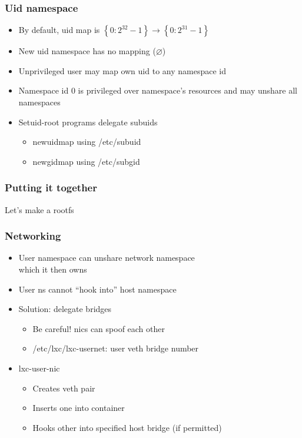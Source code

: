 \documentclass{beamer}
\begin{document}
\begin{frame}
\frametitle{Uid namespace}
	\begin{itemize}
	\item By default, uid map is $\left\{0:2^{32}-1\right\} \rightarrow \left\{ 0:2^{31}-1\right\}$
	\item New uid namespace has no mapping ($\varnothing$)
	\item Unprivileged user may map own uid to any namespace id
	\item Namespace id 0 is privileged over namespace's resources and may unshare all namespaces
	\item Setuid-root programs delegate subuids
		\begin{itemize}
		\item newuidmap using /etc/subuid
		\item newgidmap using /etc/subgid
		\end{itemize}
	\end{itemize}

\end{frame}

\begin{frame}
\frametitle{Putting it together}
Let's make a rootfs
\end{frame}

\begin{frame}
\frametitle{Networking}
	\begin{itemize}
	\item User namespace can unshare network namespace \\
		which it then owns
	\item User ns cannot ``hook into'' host namespace
	\item Solution: delegate bridges
		\begin{itemize}
		\item Be careful! nics can spoof each other
		\item /etc/lxc/lxc-usernet: user veth bridge number
		\end{itemize}
	\item lxc-user-nic
		\begin{itemize}
		\item Creates veth pair
		\item Inserts one into container
		\item Hooks other into specified host bridge (if permitted)
		\end{itemize}
	\end{itemize}
\end{frame}
\end{document}

